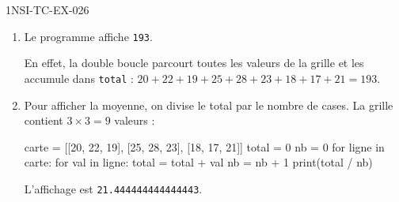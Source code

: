 \begin{corrige}{1NSI-TC-EX-026}
\begin{enumerate}
  \item Le programme affiche \lstinline{193}.

  En effet, la double boucle parcourt toutes les valeurs de la grille et les accumule dans \lstinline{total} : $20+22+19+25+28+23+18+17+21 = 193$.

  \item Pour afficher la moyenne, on divise le total par le nombre de cases. La grille contient $3 \times 3 = 9$ valeurs :
\begin{python}
carte = [[20, 22, 19],
         [25, 28, 23],
         [18, 17, 21]]
total = 0
nb = 0
for ligne in carte:
    for val in ligne:
        total = total + val
        nb = nb + 1
print(total / nb)
\end{python}
  L'affichage est \lstinline{21.444444444444443}.
\end{enumerate}
\end{corrige}
